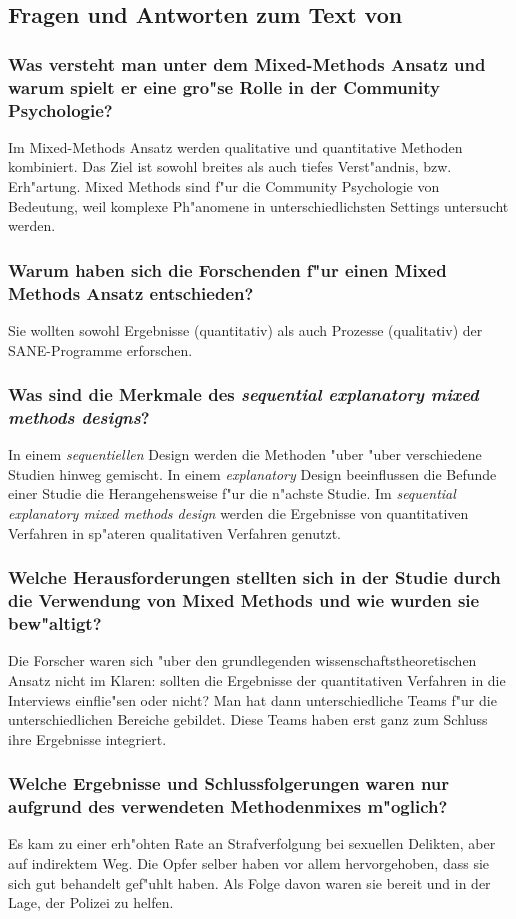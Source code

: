 \subsection{Fragen und Antworten zum Text von \textcite{campbell_integrating_2012}}
\subsubsection{Was  versteht man unter dem Mixed-Methods Ansatz und warum spielt er eine gro"se Rolle in der Community Psychologie?}
Im Mixed-Methods Ansatz werden qualitative und quantitative Methoden kombiniert. Das Ziel ist sowohl breites als auch tiefes Verst"andnis, bzw. Erh"artung. Mixed Methods sind f"ur die Community Psychologie von Bedeutung, weil komplexe Ph"anomene in unterschiedlichsten Settings untersucht werden.

\subsubsection{Warum haben sich die Forschenden f"ur einen Mixed Methods Ansatz entschieden?}
Sie wollten sowohl Ergebnisse (quantitativ) als auch Prozesse (qualitativ) der SANE-Programme erforschen.

\subsubsection{Was sind die Merkmale des \emph{sequential explanatory mixed methods designs}?}
In einem \emph{sequentiellen} Design werden die Methoden "uber "uber verschiedene Studien hinweg gemischt. In einem \emph{explanatory} Design beeinflussen die Befunde einer Studie die Herangehensweise f"ur die n"achste Studie. Im \emph{sequential explanatory mixed methods design} werden die Ergebnisse von quantitativen Verfahren in sp"ateren qualitativen Verfahren genutzt.  

\subsubsection{Welche Herausforderungen stellten sich in der Studie durch die Verwendung von Mixed Methods und wie wurden sie bew"altigt?}
Die Forscher waren sich "uber den grundlegenden wissenschaftstheoretischen Ansatz nicht im Klaren: sollten die Ergebnisse der quantitativen Verfahren in die Interviews einflie"sen oder nicht? Man hat dann unterschiedliche Teams f"ur die unterschiedlichen Bereiche gebildet. Diese Teams haben erst ganz zum Schluss ihre Ergebnisse integriert.  

\subsubsection{Welche Ergebnisse und Schlussfolgerungen waren nur aufgrund des verwendeten Methodenmixes m"oglich?}
Es kam zu einer erh"ohten Rate an Strafverfolgung bei sexuellen Delikten, aber auf indirektem Weg. Die Opfer selber haben vor allem hervorgehoben, dass sie sich gut behandelt gef"uhlt haben. Als Folge davon waren sie bereit und in der Lage, der Polizei zu helfen. 
